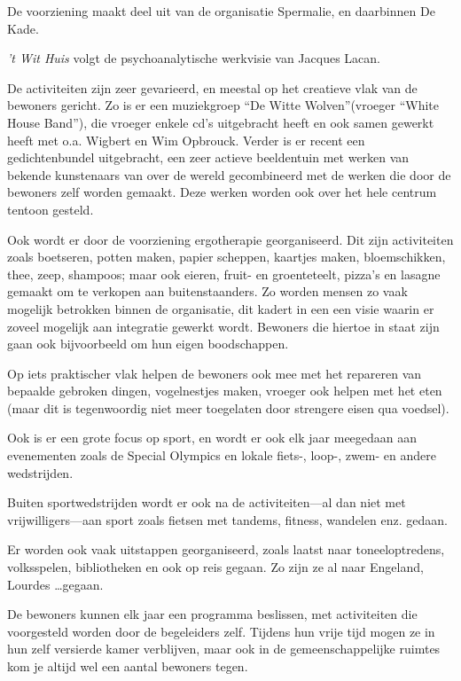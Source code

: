 \documentclass[a4paper,12pt]{article}
\begin{document}
De voorziening maakt deel uit van de organisatie Spermalie, en daarbinnen De Kade.

\emph{’t Wit Huis} volgt de psychoanalytische werkvisie van Jacques Lacan.%

De activiteiten zijn zeer gevarieerd, en meestal op het creatieve vlak van de bewoners gericht. Zo is er een muziekgroep ``De Witte Wolven''(vroeger ``White House Band''), die vroeger enkele cd's uitgebracht heeft en ook samen gewerkt heeft met o.a. Wigbert en Wim Opbrouck. Verder is er recent een gedichtenbundel uitgebracht, een zeer actieve beeldentuin met werken van bekende kunstenaars van over de wereld gecombineerd met de werken die door de bewoners zelf worden gemaakt. Deze werken worden ook over het hele centrum tentoon gesteld.

Ook wordt er door de voorziening ergotherapie georganiseerd. Dit zijn activiteiten zoals boetseren, potten maken, papier scheppen, kaartjes maken, bloemschikken, thee, zeep, shampoos; maar ook eieren, fruit- en groenteteelt, pizza's en lasagne gemaakt om te verkopen aan buitenstaanders. Zo worden mensen zo vaak mogelijk betrokken binnen de organisatie, dit kadert in een een visie waarin er zoveel mogelijk aan integratie gewerkt wordt. Bewoners die hiertoe in staat zijn gaan ook bijvoorbeeld om hun eigen boodschappen.

Op iets praktischer vlak helpen de bewoners ook mee met het repareren van bepaalde gebroken dingen, vogelnestjes maken, vroeger ook helpen met het eten (maar dit is tegenwoordig niet meer toegelaten door strengere eisen qua voedsel).

Ook is er een grote focus op sport, en wordt er ook elk jaar meegedaan aan evenementen zoals de Special Olympics en lokale fiets-, loop-, zwem- en andere wedstrijden.

Buiten sportwedstrijden wordt er ook na de activiteiten---al dan niet met vrijwilligers---aan sport zoals fietsen met tandems, fitness, wandelen enz. gedaan.

Er worden ook vaak uitstappen georganiseerd, zoals laatst naar toneeloptredens, volksspelen, bibliotheken en ook op reis gegaan. Zo zijn ze al naar Engeland, Lourdes \dots gegaan.

De bewoners kunnen elk jaar een programma beslissen, met activiteiten die voorgesteld worden door de begeleiders zelf. Tijdens hun vrije tijd mogen ze in hun zelf versierde kamer verblijven, maar ook in de gemeenschappelijke ruimtes kom je altijd wel een aantal bewoners tegen.
\end{document}
